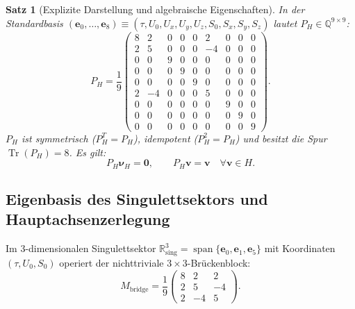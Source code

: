 \documentclass[11pt,a4paper]{article}
\theoremstyle{plain}
\newtheorem{theorem}{Satz}[section]
\theoremstyle{definition}
\newcommand{\Q}{\mathbb{Q}}
\newcommand{\R}{\mathbb{R}}
\DeclareMathOperator{\Tr}{Tr}
\begin{document}
\begin{theorem}[Explizite Darstellung und algebraische Eigenschaften]
In der Standardbasis $(\mathbf{e}_0, \dots, \mathbf{e}_8) \equiv (\tau, U_0, U_x, U_y, U_z, S_0, S_x, S_y, S_z)$ lautet $P_H \in \Q^{9 \times 9}$:
\begin{equation}
    P_H = \frac{1}{9} \begin{pmatrix}
         8 &  2 & 0 & 0 & 0 &  2 & 0 & 0 & 0 \\
         2 &  5 & 0 & 0 & 0 & -4 & 0 & 0 & 0 \\
         0 &  0 & 9 & 0 & 0 &  0 & 0 & 0 & 0 \\
         0 &  0 & 0 & 9 & 0 &  0 & 0 & 0 & 0 \\
         0 &  0 & 0 & 0 & 9 &  0 & 0 & 0 & 0 \\
         2 & -4 & 0 & 0 & 0 &  5 & 0 & 0 & 0 \\
         0 &  0 & 0 & 0 & 0 &  0 & 9 & 0 & 0 \\
         0 &  0 & 0 & 0 & 0 &  0 & 0 & 9 & 0 \\
         0 &  0 & 0 & 0 & 0 &  0 & 0 & 0 & 9
    \end{pmatrix}.
\end{equation}
$P_H$ ist symmetrisch ($P_H^T = P_H$), idempotent ($P_H^2 = P_H$) und besitzt die Spur $\Tr(P_H) = 8$. Es gilt:
\begin{equation}
    P_H \boldsymbol{\nu}_H = \mathbf{0}, \qquad P_H \mathbf{v} = \mathbf{v} \quad \forall \mathbf{v} \in H.
\end{equation}
\end{theorem}

\subsection{Eigenbasis des Singulettsektors und Hauptachsenzerlegung}

Im 3-dimensionalen Singulettsektor $\R^3_{\mathrm{sing}} = \operatorname{span}\{\mathbf{e}_0, \mathbf{e}_1, \mathbf{e}_5\}$ mit Koordinaten $(\tau, U_0, S_0)$ operiert der nichttriviale $3 \times 3$-Brückenblock:
\begin{equation}
    M_{\mathrm{bridge}} = \frac{1}{9} \begin{pmatrix}
        8 &  2 &  2 \\
        2 &  5 & -4 \\
        2 & -4 &  5
    \end{pmatrix}.
\end{equation}
\end{document}
